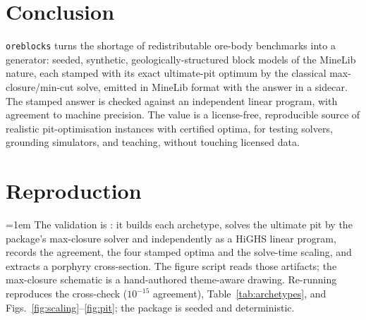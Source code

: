 \documentclass[journal]{IEEEtran}
\begin{document}
\section{Conclusion}

\texttt{oreblocks} turns the shortage of redistributable ore-body benchmarks into a generator: seeded, synthetic,
geologically-structured block models of the MineLib nature, each stamped with its exact ultimate-pit optimum by
the classical max-closure/min-cut solve, emitted in MineLib format with the answer in a sidecar. The stamped
answer is checked against an independent linear program, with agreement to machine precision.
The value is a license-free, reproducible source of realistic pit-optimisation instances with certified optima,
for testing solvers, grounding simulators, and teaching, without touching licensed data.

\appendices
\section{Reproduction}\label{app:repro}

{\raggedright\parindent=1em
The validation is : it builds each archetype,
solves the ultimate pit by the package's max-closure solver and independently as a HiGHS linear program, records
the agreement, the four stamped optima and the solve-time scaling, and extracts a porphyry cross-section. The
figure script reads those artifacts; the max-closure schematic is a hand-authored theme-aware drawing. Re-running
reproduces the cross-check ($10^{-15}$ agreement), Table~\ref{tab:archetypes}, and
Figs.~\ref{fig:scaling}--\ref{fig:pit}; the package is seeded and deterministic.\par}

\balance
\end{document}
